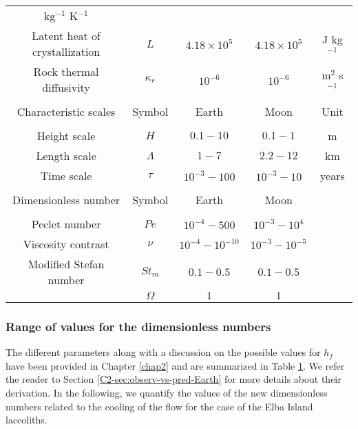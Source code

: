 \begin{table}[h!]
\begin{center}
{\begin{tabular}{c|c|c|c|c}
                                                                      kg$^{-1}$ K$^{-1}$\\
        Latent       heat       of      crystallization&       $L$       &
                                                                           $4.18\times10^5$&$4.18\times10^5$& J kg$^{-1}$\\
        Rock  thermal  diffusivity  &$\kappa_r$& $10^{-6}$  &$10^{-6}$  &
                                                                          m$^{2}$
                                                                          s$^{-1}$\\
                  &&&&\\
        \hline
        Characteristic scales & Symbol & Earth & Moon&Unit\\
        \hline
                  &&&&\\
        Height scale & $H$& $0.1-10$ &$0.1-1$ &m \\
        Length scale & $\Lambda$ & $1-7$&$2.2-12$& km \\
        Time scale & $\tau$ & $10^{-3}-100$&$10^{-3}-10$& years \\
                  &&&&\\
        \hline
        Dimensionless number & Symbol & Earth & Moon&\\
        \hline
                  &&&&\\
        Peclet number &$Pe$& $10^{-4}-500$&$10^{-3}-10^4$ &\\
        Viscosity contrast & $\nu$ & $10^{-4}-10^{-10}$& $10^{-3}-10^{-5}$&\\
        Modified Stefan number & $St_m$ & $0.1-0.5$ &  $0.1-0.5$ &\\
                  &$\Omega$ & $1$ & $1$&
                                         \label{C4-tab2}
      \end{tabular} 
    }
  \end{center}
  \label{C4-tab}
\end{table}

\subsubsection*{Range of values for the dimensionless numbers}
\label{C4-sec:range-valu-dimens}
 
The  different parameters  along  with a  discussion  on the  possible
values for  $h_f$ have  been provided in  Chapter \ref{chap2}  and are
summarized  in Table  \ref{C4-tab}.  We  refer the  reader to  Section
\ref{C2-sec:observ-vs-pred-Earth}   for  more   details  about   their
derivation.   In the  following, we  quantify  the values  of the  new
dimensionless numbers related to the cooling  of the flow for the case
of the Elba Island laccoliths.

